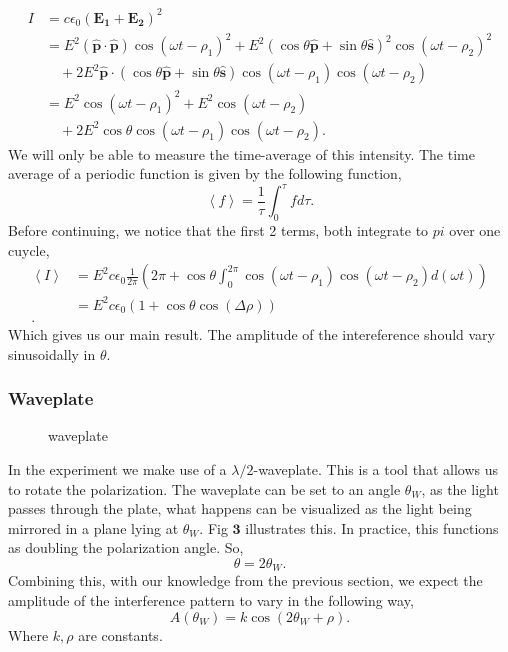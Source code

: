 \documentclass[working, oneside]{inputs/tuftebook}
\begin{document}
\begin{align*}
	I &= c\epsilon_0 \left( \bm{E_1} + \bm{E_2} \right)^2 \\
	&= E^2\left( \hat{\bm{p}}\cdot \hat{\bm{p}} \right)\cos\left( \omega t - \rho_1 \right)^2  + E^2\left( \cos\theta \bm{\hat{p}}+ \sin \theta \bm{\hat{s}} \right) ^2 \cos\left( \omega t -\rho_2 \right) ^2  \\
	& \quad + 2E^2 \bm{\hat{p}}\cdot \left(   \cos\theta \bm{\hat{p}}+ \sin \theta \bm{\hat{s}} \right)\cos\left( \omega t - \rho_1 \right) \cos\left( \omega t - \rho_2 \right) \\
	&= E^2 \cos\left( \omega t - \rho_1 \right) ^2 + E^2 \cos\left( \omega t - \rho_2 \right) \\
	&\quad + 2E^2\cos \theta\cos\left( \omega t - \rho_1 \right)\cos\left( \omega t - \rho_2 \right)  
.\end{align*}
We will only be able to measure the time-average of this intensity. The time average of a periodic function is given by the following function,
\[
\left< f \right> = \frac{1}{\tau} \int_{0}^{\tau} f d\tau  
.\]
Before continuing, we notice that the first 2 terms, both integrate to $pi$ over one cuycle,
\begin{align*}
	\left<I \right> &= E^2c\epsilon_0 \frac{1}{2\pi} \left( 2\pi + \cos\theta \int_{0}^{2\pi} \cos\left( \omega t - \rho_1 \right) \cos\left( \omega t - \rho _2 \right)  d\left( \omega t \right) \right) \\
	&= E^2c\epsilon_0 \left( 1 + \cos\theta \cos\left( \Delta \rho  \right)  \right)  \\
.\end{align*}
Which gives us our main result. The amplitude of the intereference should vary sinusoidally in $\theta $.
\subsubsection{Waveplate}
\begin{figure}[ht]
    \centering
    \caption{waveplate}
    \label{fig:waveplate}
\end{figure}
In the experiment we make use of a $\lambda /2$-waveplate. This is a tool that allows us to rotate the polarization. The waveplate can be set to an angle $\theta _W$, as the light  passes through the plate, what happens can be visualized as the light being mirrored in a plane lying at $\theta_W$. Fig $\bm{3}$ illustrates this. In practice, this functions as doubling the polarization angle. So,
\[
\theta = 2\theta_W
.\] 
Combining this, with our knowledge from the previous section, we expect the amplitude of the interference pattern to vary in the following way,
\[
A\left( \theta _W \right) = k \cos\left( 2\theta_W + \rho \right) 
.\] 
Where $k, \rho $ are constants.
\end{document}
